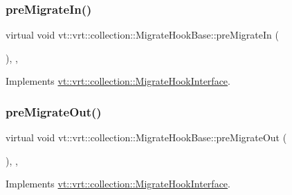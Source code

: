 \subsubsection{\texorpdfstring{pre\+Migrate\+In()}{preMigrateIn()}}
{\footnotesize\ttfamily virtual void vt\+::vrt\+::collection\+::\+Migrate\+Hook\+Base\+::pre\+Migrate\+In (\begin{DoxyParamCaption}{ }\end{DoxyParamCaption})\hspace{0.3cm}{\ttfamily [inline]}, {\ttfamily [override]}, {\ttfamily [virtual]}}



Implements \hyperlink{structvt_1_1vrt_1_1collection_1_1_migrate_hook_interface_a7bd07b1d69bc1cce87da2ce06231f382}{vt\+::vrt\+::collection\+::\+Migrate\+Hook\+Interface}.

\mbox{\label{structvt_1_1vrt_1_1collection_1_1_migrate_hook_base_aefb49af057c90295e89ae029fd7ba8bb}} 
\subsubsection{\texorpdfstring{pre\+Migrate\+Out()}{preMigrateOut()}}
{\footnotesize\ttfamily virtual void vt\+::vrt\+::collection\+::\+Migrate\+Hook\+Base\+::pre\+Migrate\+Out (\begin{DoxyParamCaption}{ }\end{DoxyParamCaption})\hspace{0.3cm}{\ttfamily [inline]}, {\ttfamily [override]}, {\ttfamily [virtual]}}



Implements \hyperlink{structvt_1_1vrt_1_1collection_1_1_migrate_hook_interface_a62bb547d9fb604428bc48bf324e3bc14}{vt\+::vrt\+::collection\+::\+Migrate\+Hook\+Interface}.

\mbox{\label{structvt_1_1vrt_1_1collection_1_1_migrate_hook_base_adddec175b7d649557c2f297174c238c6}} 
